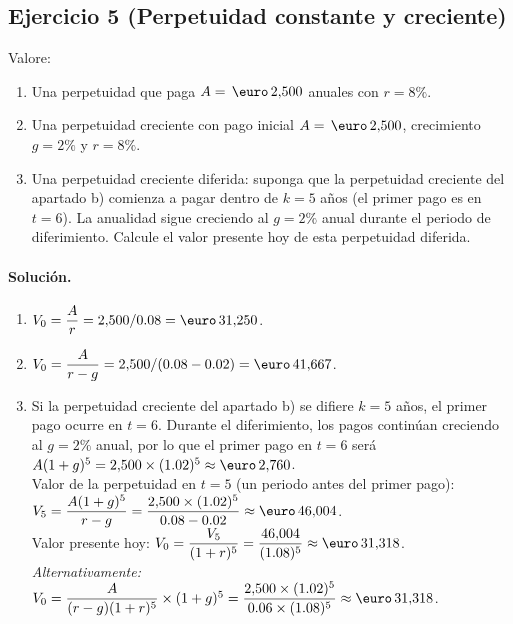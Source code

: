 \documentclass[12pt,a4paper]{article}
\newenvironment{ejercicio}[1]{\subsection*{Ejercicio #1}}{}
\newenvironment{solucion}{\paragraph{Solución.}}{}
\begin{document}
\begin{ejercicio}{5 (Perpetuidad constante y creciente)}
Valore:
\begin{enumerate}[label=\alph*)]
  \item Una perpetuidad que paga $A=\,\text{\euro}\,2{,}500$ anuales con $r=8\%$.
  \item Una perpetuidad creciente con pago inicial $A=\,\text{\euro}\,2{,}500$, crecimiento $g=2\%$ y $r=8\%$.
  \item Una perpetuidad creciente diferida: suponga que la perpetuidad creciente del apartado b) comienza a pagar dentro de $k=5$ años (el primer pago es en $t=6$). La anualidad sigue creciendo al $g=2\%$ anual durante el periodo de diferimiento. Calcule el valor presente hoy de esta perpetuidad diferida.
\end{enumerate}
\end{ejercicio}
\begin{solucion}
\begin{enumerate}[label=\alph*)]
  \item $V_0=\dfrac{A}{r}=2{,}500/0.08=\text{\euro}\,31{,}250$.
  \item $V_0=\dfrac{A}{r-g}=2{,}500/(0.08-0.02)=\text{\euro}\,41{,}667$.
  \item Si la perpetuidad creciente del apartado b) se difiere $k=5$ años, el primer pago ocurre en $t=6$. Durante el diferimiento, los pagos continúan creciendo al $g=2\%$ anual, por lo que el primer pago en $t=6$ será $A(1+g)^5=2{,}500\times(1.02)^5\approx\text{\euro}\,2{,}760$. \\
        Valor de la perpetuidad en $t=5$ (un periodo antes del primer pago): $V_5=\dfrac{A(1+g)^5}{r-g}=\dfrac{2{,}500\times(1.02)^5}{0.08-0.02}\approx\text{\euro}\,46{,}004$. \\
        Valor presente hoy: $V_0=\dfrac{V_5}{(1+r)^5}=\dfrac{46{,}004}{(1.08)^5}\approx\text{\euro}\,31{,}318$. \\
        \textit{Alternativamente:} $V_0=\dfrac{A}{(r-g)(1+r)^5}\times(1+g)^5=\dfrac{2{,}500\times(1.02)^5}{0.06\times(1.08)^5}\approx\text{\euro}\,31{,}318$.
\end{enumerate}
\end{solucion}
\end{document}
